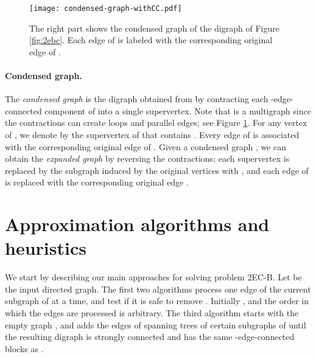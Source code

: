\documentclass[11pt]{article}
\begin{document}
\begin{figure}[t]
\begin{center}
\texttt{[image: condensed-graph-withCC.pdf]}
\end{center}
\vspace*{-0.1in}
\caption{The right part shows the condensed graph  of the digraph of Figure \ref{fig:2ebc}. Each edge of  is labeled with the corresponding original edge of .}
\label{fig:condensed}
\end{figure}

\paragraph{Condensed graph.} The \emph{condensed graph} is the digraph  obtained from  by contracting each -edge-connected component of  into a single supervertex.
Note that  is a multigraph since the contractions can create loops and parallel edges; see Figure \ref{fig:condensed}.
For any vertex  of , we denote by  the supervertex of  that contains .
Every edge  of  is associated with the corresponding original edge  of .
Given a condensed graph , we can obtain the \emph{expanded graph} by reversing the contractions; each supervertex  is replaced by the subgraph induced by the original vertices  with , and each edge  of  is replaced with the corresponding original edge .


\section{Approximation algorithms and heuristics}
\label{sec:algorithms}

We start by describing our main approaches for solving problem
\textsf{2EC-B}. Let  be the input directed graph.
The first two algorithms
process one edge  of the current subgraph  of  at a time, and test if it is safe to remove . Initially , and the order in which the edges are processed is arbitrary. The third algorithm starts with the empty graph , and adds the edges of spanning trees of certain subgraphs of  until the resulting digraph is strongly connected and has the same -edge-connected blocks as .
\end{document}
